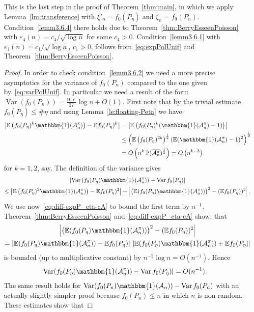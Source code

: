 \documentclass[AHL,Unicode,longabstracts,published]{cedram}
\newcommand{\ind}{\mathbbm{1}}
\newcommand{\var}{\operatorname{Var}}
\newcommand{\bbE}{\mathbb{E}}
\newcommand{\bbP}{\mathbb{P}}
\newcommand{\clA}{\mathcal{A}}
\begin{document}
This is the last step in the proof of Theorem~\ref{thm:main}, in which we apply Lemma~\ref{lm:transference} with $\xi'_n=f_0(P_{\eta})$ and $\xi_n=f_0(P_n)$. Condition~\eqref{lemm3.6.4} there holds due to Theorem~\ref{thm:BerryEsseenPoisson} with $\varepsilon_4(n)=c_4/\sqrt{\log n}$ for some $c_4>0$. Condition~\eqref{lemm3.6.1} with $\varepsilon_1(n)=c_1/\sqrt{\log n}$, $c_1>0$, follows from~\eqref{eq:expPolUnif} and Theorem~\ref{thm:BerryEsseenPoisson}.

\begin{proof}
In order to check condition~\eqref{lemm3.6.2} we need a more precise asymptotics for the variance of $f_0(P_n)$ compared to the one given by~\eqref{eq:varPolUnif}. In particular we need a result of the form $\var(f_0(P_{n}))=\frac{10 \ell}{27} \log n +O(1)$. First note that by the trivial estimate $f_0(P_\eta) \leq \# \eta$ and using Lemma~\ref{le:floating-Peta} we have
\begin{equation}\label{eq:diff-expP_eta-cA}
\begin{split}
\left| \bbE \left(f_0(P_\eta)^k \ind(\clA^\pi_n)\right) - \bbE f_0(P_\eta)^k \right| &= \left| \bbE \left(f_0(P_\eta)^k (\ind (\clA^\pi_n) -1)\right) \right|\\ 
&\leq \left(\bbE \left(f_0(P_\eta)^{2k}\right)^{\frac 12} (\bbE (\ind (\clA^\pi_n) -1)^2\right)^{\frac 12}
\\ & = O\left(n^k \, \bbP(\overline{\clA^\pi_n})^{\frac 12}\right) = O\left(n^{k-3}\right)
\end{split}
\end{equation}
for $k=1,2$, say. The definition of the variance gives
\begin{multline*}
\left| \var \left(f_0(P_\eta)  \ind (\clA^\pi_n)\right) - \var f_0(P_\eta) \right|
\\  \leq \left| \bbE \left(f_0(P_\eta)^2 \ind(\clA^\pi_n)\right) - \bbE f_0(P_\eta)^2 \right| + \left|\big(\bbE (f_0(P_\eta) \ind(\clA^\pi_n))\big)^2 - (\bbE f_0(P_\eta))^2 \right|.
\end{multline*}
We use now~\eqref{eq:diff-expP_eta-cA} to bound the first term by $n^{-1}$. Theorem~\ref{thm:BerryEsseenPoisson} and~\eqref{eq:diff-expP_eta-cA} show, that
\begin{multline*}
\left| \big(\bbE (f_0(P_\eta) \ind(\clA^\pi_n))\big)^2  - (\bbE f_0(P_\eta))^2 \right|\\
 = \left| \bbE (f_0(P_\eta) \ind(\clA^\pi_n)) - \bbE f_0(P_\eta) \right|\, \left| \bbE (f_0(P_\eta) \ind(\clA^\pi_n)) + \bbE f_0(P_\eta) \right|
\end{multline*}
is bounded (up to multiplicative constant) by $n^{-2} \log n = O(n^{-1})$. Hence
\begin{align*}
\left| \var (f_0(P_\eta) \ind(\clA^\pi_n)) - \var f_0(P_\eta) \right| & = O(n^{-1}).
\end{align*}
The same result holds for $ \var (f_0(P_n) \ind(\clA_n)) - \var f_0(P_n) $ with an actually slightly simpler proof because $f_0(P_n) \leq n$ in which $n$ is non-random. These estimates show that


\end{proof}
\end{document}
